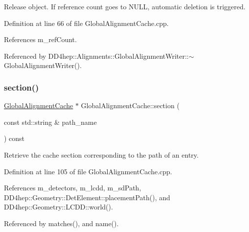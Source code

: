 Release object. If reference count goes to N\+U\+LL, automatic deletion is triggered. 



Definition at line 66 of file Global\+Alignment\+Cache.\+cpp.



References m\+\_\+ref\+Count.



Referenced by D\+D4hep\+::\+Alignments\+::\+Global\+Alignment\+Writer\+::$\sim$\+Global\+Alignment\+Writer().

\hypertarget{class_d_d4hep_1_1_alignments_1_1_global_alignment_cache_a73e41cb5def2356b5638c46e16645341}{}\label{class_d_d4hep_1_1_alignments_1_1_global_alignment_cache_a73e41cb5def2356b5638c46e16645341} 
\subsubsection{\texorpdfstring{section()}{section()}}
{\footnotesize\ttfamily \hyperlink{class_d_d4hep_1_1_alignments_1_1_global_alignment_cache}{Global\+Alignment\+Cache} $\ast$ Global\+Alignment\+Cache\+::section (\begin{DoxyParamCaption}\item[{const std\+::string \&}]{path\+\_\+name }\end{DoxyParamCaption}) const}



Retrieve the cache section corresponding to the path of an entry. 



Definition at line 105 of file Global\+Alignment\+Cache.\+cpp.



References m\+\_\+detectors, m\+\_\+lcdd, m\+\_\+sd\+Path, D\+D4hep\+::\+Geometry\+::\+Det\+Element\+::placement\+Path(), and D\+D4hep\+::\+Geometry\+::\+L\+C\+D\+D\+::world().



Referenced by matches(), and name().

\hypertarget{class_d_d4hep_1_1_alignments_1_1_global_alignment_cache_a0b72802fee6eaf03765e5a3cd46c5a60}{}\label{class_d_d4hep_1_1_alignments_1_1_global_alignment_cache_a0b72802fee6eaf03765e5a3cd46c5a60} 

